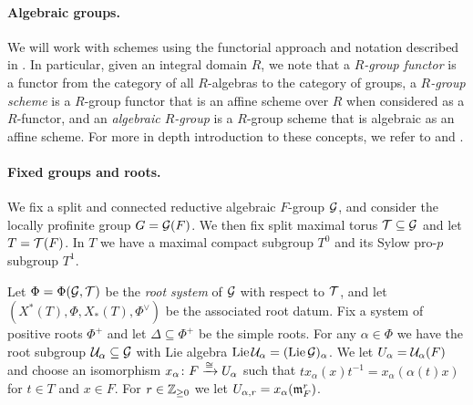 \paragraph{Algebraic groups.} We will work with schemes using the functorial approach and notation described in \cite{Jan}. In particular, given an integral domain $R$, we note that a \emph{$R$-group functor} is a functor from the category of all $R$-algebras to the category of groups, a \emph{$R$-group scheme} is a $R$-group functor that is an affine scheme over $R$ when considered as a $R$-functor, and an \emph{algebraic $R$-group} is a $R$-group scheme that is algebraic as an affine scheme. For more in depth introduction to these concepts, we refer to \cite{Con-book} and \cite{Jan}.

\paragraph{Fixed groups and roots.} We fix a split and connected reductive algebraic $F$-group $\mathcal{G}$, and consider the locally profinite group $G = \mathcal{G}(F)$. We then fix split maximal torus $\mathcal{T} \subseteq \mathcal{G}$ and let $T = \mathcal{T}(F)$. In $T$ we have a maximal compact subgroup $T^{0}$ and its Sylow pro-$p$ subgroup $T^{1}$.

Let $\Phi = \Phi(\mathcal{G},\mathcal{T})$ be the \emph{root system} of $\mathcal{G}$ with respect to $\mathcal{T}$, and let $(X^{*}(T),\Phi,X_{*}(T),\Phi^{\vee})$ be the associated root datum. Fix a system of positive roots $\Phi^{+}$ and let $\Delta \subseteq \Phi^{+}$ be the simple roots. For any $\alpha \in \Phi$ we have the root subgroup $\mathcal{U}_{\alpha} \subseteq \mathcal{G}$ with Lie algebra $\operatorname{Lie} \mathcal{U}_{\alpha} =  (\operatorname{Lie} \mathcal{G})_{\alpha}$. We let $U_{\alpha} = \mathcal{U}_{\alpha}(F)$ and choose an isomorphism $x_{\alpha} \colon F \xrightarrow{\cong} U_{\alpha}$ such that $tx_{\alpha}(x)t^{-1} = x_{\alpha}(\alpha(t)x)$ for $t \in T$ and $x \in F$. For $r \in \mathbb{Z}_{\geq 0}$ we let $U_{\alpha,r} = x_{\alpha}(\mathfrak{m}_{F}^{r})$.

